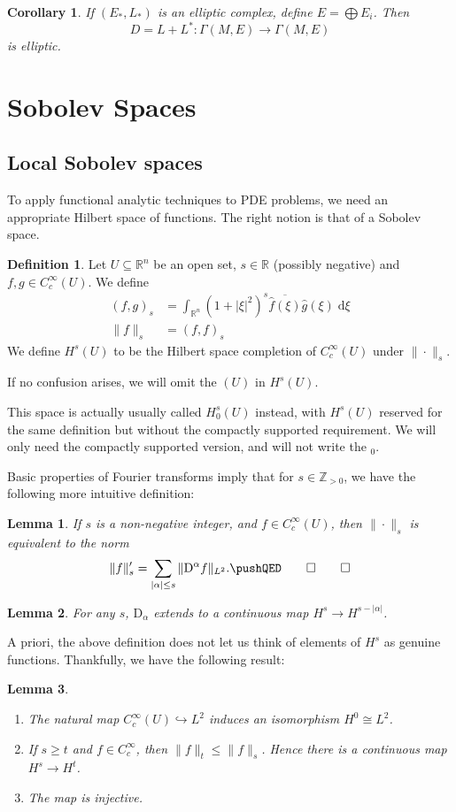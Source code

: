 \documentclass{shortart}
\newtheorem*{lemma}{Lemma}
\newtheorem*{cor}{Corollary}
\theoremstyle{definition}
\newtheorem*{defi}{Definition}
\newcommand\R{\mathbb{R}}
\newcommand\Z{\mathbb{Z}}
\newcommand\der{\mathrm{d}}
\newcommand\D{\mathrm{D}}
\begin{document}
\begin{cor}
  If $(E_*, L_*)$ is an elliptic complex, define $E = \bigoplus E_i$. Then
  \[
    D = L + L^*: \Gamma(M, E) \to \Gamma(M, E)
  \]
  is elliptic.\fakeqed
\end{cor}

\section{Sobolev Spaces}
\subsection{Local Sobolev spaces}
To apply functional analytic techniques to PDE problems, we need an appropriate Hilbert space of functions. The right notion is that of a Sobolev space.
\begin{defi}
  Let $U \subseteq \R^n$ be an open set, $s \in \R$ (possibly negative) and $f, g \in C_c^\infty(U)$. We define
  \begin{align*}
    (f, g)_s &= \int_{\R^n} (1 + |\xi|^2)^s \overline{\hat{f}(\xi)}\hat{g}(\xi) \;\der \xi\\
    \|f\|_s &= (f, f)_s
  \end{align*}
  We define $H^s(U)$ to be the Hilbert space completion of $C_c^\infty(U)$ under $\|\cdot\|_s$.

  If no confusion arises, we will omit the $(U)$ in $H^s(U)$.
\end{defi}
This space is actually usually called $H_0^s(U)$ instead, with $H^s(U)$ reserved for the same definition but without the compactly supported requirement. We will only need the compactly supported version, and will not write the $_0$.

Basic properties of Fourier transforms imply that for $s \in \Z_{>0}$, we have the following more intuitive definition:
\begin{lemma}
  If $s$ is a non-negative integer, and $f \in C_c^\infty(U)$, then $\|\cdot\|_s$ is equivalent to the norm
  \[
    \|f\|_s' = \sum_{|\alpha| \leq s} \|\mathrm{D}^\alpha f\|_{L^2}.\fakeqed
  \]\ifplastex\fakeqed\fi
\end{lemma}
\begin{lemma}
  For any $s$, $\D_\alpha$ extends to a continuous map $H^s \to H^{s - |\alpha|}$.\fakeqed
\end{lemma}
A priori, the above definition does not let us think of elements of $H^s$ as genuine functions. Thankfully, we have the following result:
\begin{lemma}\leavevmode
  \begin{enumerate}
    \item The natural map $C_c^\infty(U) \hookrightarrow L^2$ induces an isomorphism $H^0 \cong L^2$.
    \item If $s \geq t$ and $f \in C_c^\infty$, then $\|f\|_t \leq \|f\|_s$. Hence there is a continuous map $H^s \to H^t$.
    \item The map is injective.
  \end{enumerate}
\end{lemma}
\end{document}

